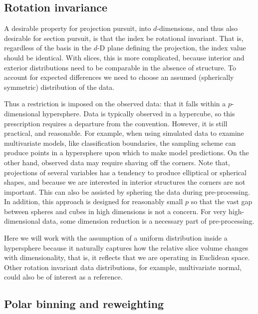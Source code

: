 \documentclass[]{interact}
\theoremstyle{plain}%
\theoremstyle{definition}
\theoremstyle{remark}
\begin{document}
\hypertarget{rotation-invariance}{%
\subsection{\texorpdfstring{Rotation invariance
\label{sec:rotinv}}{Rotation invariance }}\label{rotation-invariance}}

A desirable property for projection pursuit, into \(d\)-dimensions, and
thus also desirable for section pursuit, is that the index be rotational
invariant. That is, regardless of the basis in the \(d\)-D plane
defining the projection, the index value should be identical. With
slices, this is more complicated, because interior and exterior
distributions need to be comparable in the absence of structure. To
account for expected differences we need to choose an assumed
(spherically symmetric) distribution of the data.

Thus a restriction is imposed on the observed data: that it falls within
a \(p\)-dimensional hypersphere. Data is typically observed in a
hypercube, so this prescription requires a departure from the
convention. However, it is still practical, and reasonable. For example,
when using simulated data to examine multivariate models, like
classification boundaries, the sampling scheme can produce points in a
hypersphere upon which to make model predictions. On the other hand,
observed data may require shaving off the corners. Note that,
projections of several variables has a tendency to produce elliptical or
spherical shapes, and because we are interested in interior structures
the corners are not important. This can also be assisted by sphering the
data during pre-processing. In addition, this approach is designed for
reasonably small \(p\) so that the vast gap between spheres and cubes in
high dimensions is not a concern. For very high-dimensional data, some
dimension reduction is a necessary part of pre-processing.

Here we will work with the assumption of a uniform distribution inside a
hypersphere because it naturally captures how the relative slice volume
changes with dimensionality, that is, it reflects that we are operating
in Euclidean space. Other rotation invariant data distributions, for
example, multivariate normal, could also be of interest as a reference.

\hypertarget{polar-binning-and-reweighting}{%
\subsection{\texorpdfstring{Polar binning and reweighting
\label{sec:binning}}{Polar binning and reweighting }}\label{polar-binning-and-reweighting}}
\end{document}
